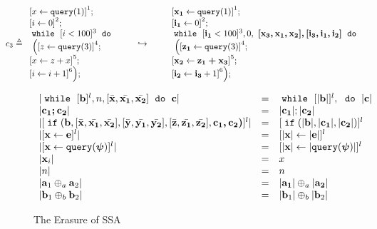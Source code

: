 \documentclass[a4paper,11pt]{article}
\begin{document}
{
\[
c_3 \triangleq
\begin{array}{l}
     \left[x \leftarrow \query(1) \right]^1 ; \\
     \left[i \leftarrow 0 \right]^2 ; \\
    \ewhile ~  [i < 100]^3 ~ \edo
    \\
    ~ \Big( 
    \left[z \leftarrow \query(3) \right]^4; \\
    \left[x \leftarrow z + x \right]^5; \\
    \left[i \leftarrow i + 1 \right]^6
    \Big) ;
\end{array}
%
\hspace{20pt} \hookrightarrow \hspace{20pt} 
%
\begin{array}{l}
     \left[\ssa{x_1} \leftarrow \query(1) \right]^1 ; \\
     \left[\ssa{i_1} \leftarrow 0 \right]^2 ; \\
    \ewhile
    ~ [\ssa{i_1} < 100]^3, 0,
    ~\ssa{[ x_3,x_1 ,x_2 ], [i_3, i_1, i_2] }~
    \edo \\
    ~ \Big( 
    \left[\ssa{z_1} \leftarrow \query(3) \right]^4; \\
    \left[ \ssa{x_2} \leftarrow \ssa{z_1 + x_3} \right]^5; \\
    \left[\ssa{i_2} \leftarrow \ssa{i_3} + 1 \right]^6
    \Big) ;
\end{array}
\]
}
%
\begin{figure}
   \[
 \begin{array}{lll}
    | \;\mathtt{while}\; ~ [ \boldsymbol{\mathbf{b}} ]^{l}, n, [\bar{\boldsymbol{\mathbf{x}}}, \bar{\boldsymbol{\mathbf{x_1}}}, \bar{\boldsymbol{\mathbf{x_2}}}] 
    ~ \;\mathtt{do}\; ~  \boldsymbol{\mathbf{c}}|  
    &=& \;\mathtt{while}\; ~ [|\boldsymbol{\mathbf{b}}|]^{l},  ~ \;\mathtt{do}\; ~ |\boldsymbol{\mathbf{c}}| 
	\\
    |\boldsymbol{\mathbf{c_1 ; c_2}}|  &=& |\boldsymbol{\mathbf{c_1}}| ; |\boldsymbol{\mathbf{c_2}}| 
    \\
    |[\;\mathtt{if}\;(\boldsymbol{\mathbf{b}},
    [ \bar{\boldsymbol{\mathbf{x}}}, \bar{\boldsymbol{\mathbf{x_1}}}, \bar{\boldsymbol{\mathbf{x_2}}}] ,
    [ \bar{\boldsymbol{\mathbf{y}}}, \bar{\boldsymbol{\mathbf{y_1}}}, \bar{\boldsymbol{\mathbf{y_2}}}] , 
    [\bar{\boldsymbol{\mathbf{z}}}, \bar{\boldsymbol{\mathbf{z_1}}}, \bar{\boldsymbol{\mathbf{z_2}}}] , 
    \boldsymbol{\mathbf{ c_1, c_2)}}]^{l}|  
    &=&
    [\;\mathtt{if}\;(|\boldsymbol{\mathbf{b}}|, |\boldsymbol{\mathbf{ c_1}}|, |\boldsymbol{\mathbf{c_2}}|)]^{l}
    \\
    | [\mathrel{ \boldsymbol{\mathbf{x}} \leftarrow \boldsymbol{\mathbf{e}} }]^{l}| & = & [\mathrel{ |\boldsymbol{\mathbf{x}}| \leftarrow |\boldsymbol{\mathbf{e}}| } ]^{l}
    \\
    | [\mathrel{ \boldsymbol{\mathbf{x}} \leftarrow {\tt query}(\boldsymbol{\mathbf{\psi}}) } ]^{l} | & = & [\mathrel{ |\boldsymbol{\mathbf{x}}| \leftarrow |{\tt query}(\boldsymbol{\mathbf{\psi}})| }]^{l}
    \\
    |\boldsymbol{\mathbf{x}}_i| & = & x 
    \\
    |n | & = & n 
    \\
    | \boldsymbol{\mathbf{a}}_1 \oplus_{a} \boldsymbol{\mathbf{a}}_2 | & = &  |\boldsymbol{\mathbf{a_1}}| \oplus_a |\boldsymbol{\mathbf{a_2}}| \\
    | \boldsymbol{\mathbf{b}}_1 \oplus_{b} \boldsymbol{\mathbf{b}}_2 | & = &  |\boldsymbol{\mathbf{b}}_1| \oplus_b |\boldsymbol{\mathbf{b}}_2|
 \end{array}
\]
    \caption{The Erasure of SSA}
    \label{fig:ssa_erasure-while}
\end{figure}
%
%
%
\end{document}
